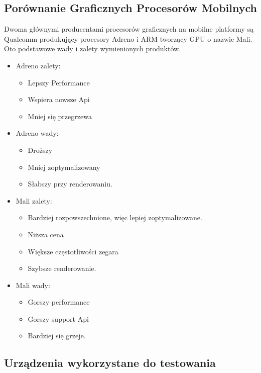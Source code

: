 \subsection[Porównanie Graficznych Procesorów Mobilnych]{Porównanie Graficznych Procesorów Mobilnych}
Dwoma głównymi producentami procesorów graficznych na mobilne platformy są Qualcomm produkujący procesory Adreno i ARM tworzący GPU o nazwie Mali. 
Oto podstawowe wady i zalety wymienionych produktów.
\begin{itemize}
	\item Adreno zalety:
	\begin{itemize}
		\item Lepszy Performance
		\item Wspiera nowsze Api
		\item Mniej się przegrzewa
	\end{itemize}
	\item Adreno wady:
	\begin{itemize}
		\item Droższy
		\item Mniej zoptymalizowany
		\item Słabszy przy renderowaniu.
	\end{itemize}
	\item Mali zalety:
	\begin{itemize}
		\item Bardziej rozpowszechnione, więc lepiej zoptymalizowane.
		\item Niższa cena
		\item Większe częstotliwości zegara
		\item Szybsze renderowanie.
	\end{itemize}
	\item Mali wady:
	\begin{itemize}
		\item Gorszy performance
		\item Gorszy support Api
		\item Bardziej się grzeje.
	\end{itemize}
\end{itemize}
	
	
\subsection[Urządzenia wykorzystane do testowania]{Urządzenia wykorzystane do testowania}
